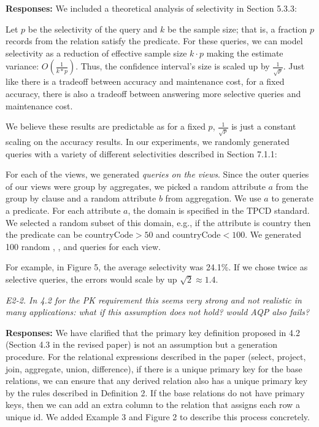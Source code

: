 {\bf Responses:} We included a theoretical analysis of selectivity in Section 5.3.3:
\begin{displayquote}
Let $p$ be the selectivity of the query and $k$ be the sample size; that is, a fraction $p$ records from the relation satisfy the predicate.
For these queries, we can model selectivity as a reduction of effective sample size $k\cdot p$ making the
estimate variance: $O(\frac{1}{k*p})$.
Thus, the confidence interval's size is scaled up by $\frac{1}{\sqrt{p}}$.
Just like there is a tradeoff between accuracy and maintenance cost, for a fixed accuracy, 
there is also a tradeoff between answering more selective queries and maintenance cost.
\end{displayquote}
We believe these results are predictable as for a fixed $p$, $\frac{1}{\sqrt{p}}$ is just a constant scaling on the accuracy results.
In our experiments, we randomly generated queries with a variety of different selectivities described in Section 7.1.1:
\begin{displayquote}
For each of the views, we generated \emph{queries on the views}.
Since the outer queries of our views were group by aggregates, we picked a random attribute $a$ from the group by clause and a random attribute $b$ from aggregation.
We use $a$ to generate a predicate.
For each attribute $a$, the domain is specified in the TPCD standard.
We selected a random subset of this domain, e.g., if the attribute is country then the predicate can be $\text{countryCode} > 50$ and $\text{countryCode} < 100$.
We generated 100 random \sumfunc, \avgfunc, and \countfunc queries for each view.
\end{displayquote}
For example, in Figure 5, the average selectivity was 24.1\%.
If we chose twice as selective queries, the errors would scale by up $\sqrt{2} \approx 1.4$.

\vspace{1em}

\emph{E2-2. In 4.2 for the PK requirement  this seems very strong and not realistic in many applications: what if this assumption does not hold? would AQP also fails?}

\vspace{.25em}

{\bf Responses:} We have clarified that the primary key definition proposed in 4.2 (Section 4.3 in the revised paper) is not an assumption but a generation procedure. For the relational expressions described in the paper (select, project, join, aggregate, union, difference), if there is a unique primary key for the base relations, we can ensure that any derived relation also has a unique primary key by the rules described in Definition 2. If the base relations do not have primary keys, then we can add an extra column to the relation that assigns each row a unique id. We added Example 3 and Figure 2 to describe this process concretely.

